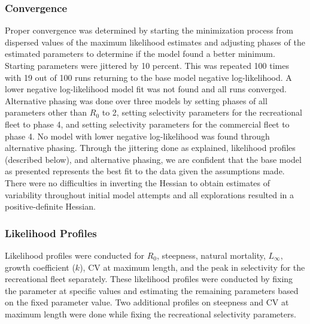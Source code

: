 \documentclass[11pt,
  english,
  letterpaper,
]{article}
\begin{document}
\hypertarget{convergence}{%
\subsubsection{Convergence}\label{convergence}}

\leavevmode\tagmcend\tagstructend


Proper convergence was determined by starting the minimization process from dispersed values of the maximum likelihood estimates and adjusting phases of the estimated parameters to determine if the model found a better minimum. Starting parameters were jittered by 10 percent. This was repeated 100 times with 19 out of 100 runs returning to the base model negative log-likelihood. A lower negative log-likelihood model fit was not found and all runs converged. Alternative phasing was done over three models by setting phases of all parameters other than {\(R_0\)\leavevmode\tagmcend\tagstructend} to 2, setting selectivity parameters for the recreational fleet to phase 4, and setting selectivity parameters for the commercial fleet to phase 4. No model with lower negative log-likelihood was found through alternative phasing. Through the jittering done as explained, likelihood profiles (described below), and alternative phasing, we are confident that the base model as presented represents the best fit to the data given the assumptions made. There were no difficulties in inverting the Hessian to obtain estimates of variability throughout initial model attempts and all explorations resulted in a positive-definite Hessian.

\leavevmode\tagmcend\tagstructend\par


\hypertarget{likelihood-profiles}{%
\subsubsection{Likelihood Profiles}\label{likelihood-profiles}}

\leavevmode\tagmcend\tagstructend


Likelihood profiles were conducted for {\(R_0\)\leavevmode\tagmcend\tagstructend}, steepness, natural mortality, {\(L_{\infty}\)\leavevmode\tagmcend\tagstructend}, growth coefficient ({\(k\)\leavevmode\tagmcend\tagstructend}), CV at maximum length, and the peak in selectivity for the recreational fleet separately. These likelihood profiles were conducted by fixing the parameter at specific values and estimating the remaining parameters based on the fixed parameter value. Two additional profiles on steepness and CV at maximum length were done while fixing the recreational selectivity parameters.
\end{document}
